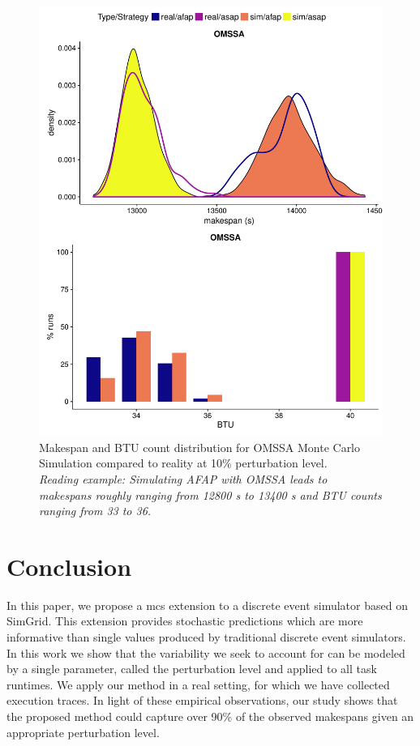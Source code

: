 \documentclass[10pt,conference,compsocconf]{IEEEtran}
\begin{document}
\begin{figure}
	\center
	\includegraphics[width=1.0\linewidth]{gfx/PP_fit.pdf}
	\caption[caption]{Makespan and BTU count distribution for OMSSA Monte
	  Carlo Simulation compared to reality at 10\% perturbation level.\\ 
	  \textit{Reading example: Simulating AFAP with OMSSA leads to makespans 
	  roughly ranging from 12800 s to 13400 s and BTU counts ranging from 33 to 36.}
	}
	\label{fig:fit}
\end{figure}

\section{Conclusion}
In this paper, we propose a \acl{mcs} extension  to a  discrete  event  simulator based  on
SimGrid.  This  extension provides stochastic predictions which are more
informative than single values produced by
traditional discrete  event simulators. In this work we show that the
variability we seek to account for can be modeled  by a  single parameter,
called the perturbation  level and applied  to all task runtimes. We apply
our method in  a real setting, for which we have collected  execution traces.  
In light of  these empirical observations, our study shows that the
proposed method could capture over 90\% of the observed makespans given  an
appropriate perturbation  level.



\end{document}
